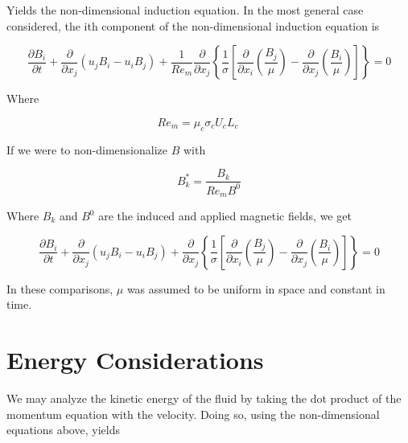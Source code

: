 \documentclass[11pt]{article}
\begin{document}
Yields the non-dimensional induction equation. In the most general case considered, the ith component of the non-dimensional induction equation is

\begin{equation}
	\frac{\partial B_i}{\partial t} 
	+ \frac{\partial}{\partial x_j} (u_j B_i - u_i B_j) 
	+ \frac{1}{Re_m}
	\frac{\partial}{\partial x_j} 
	\left\{ \frac{1}{\sigma} 
	\left[ 
	\frac{\partial}{\partial x_i} 
	\left( \frac{B_j}{\mu} \right) - 
	\frac{\partial}{\partial x_j} 
	\left( \frac{B_i}{\mu} \right)
	\right]
	\right\} = 0
\end{equation}

Where

\begin{equation}
	Re_m = \mu_c \sigma_c U_c L_c \qquad
\end{equation}

If we were to non-dimensionalize $B$ with

\begin{equation}
	B_k^* = \frac{B_k}{Re_m B^0}
\end{equation}

Where $B_k$ and $B^0$ are the induced and applied magnetic fields, we get

\begin{equation}
	\frac{\partial B_i}{\partial t} 
	+ \frac{\partial}{\partial x_j} (u_j B_i - u_i B_j) 
	+
	\frac{\partial}{\partial x_j} 
	\left\{ \frac{1}{\sigma} 
	\left[ 
	\frac{\partial}{\partial x_i} 
	\left( \frac{B_j}{\mu} \right) - 
	\frac{\partial}{\partial x_j} 
	\left( \frac{B_i}{\mu} \right)
	\right]
	\right\} = 0
\end{equation}


In these comparisons, $\mu$ was assumed to be uniform in space and constant in time.


\section{Energy Considerations}
We may analyze the kinetic energy of the fluid by taking the dot product of the momentum equation with the velocity. Doing so, using the non-dimensional equations above, yields
\end{document}
